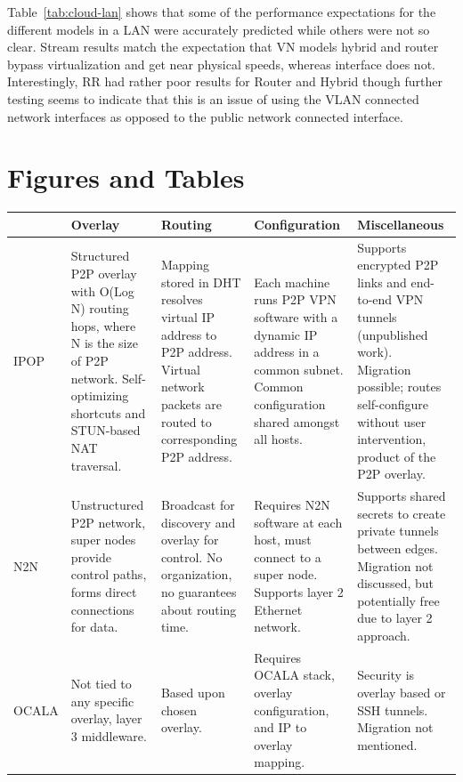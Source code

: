 Table~\ref{tab:cloud-lan} shows that some of the performance expectations
for the different models in a LAN were accurately predicted while others
were not so clear.  Stream results match the expectation that VN models hybrid
and router bypass virtualization and get near physical speeds, whereas interface
does not.  Interestingly, RR had rather poor results for Router and Hybrid
though further testing seems to indicate that this is an issue of using the
VLAN connected network interfaces as opposed to the public network connected
interface.

\section{Figures and Tables}

\begin{table}[ht]
{\small
\centering
\begin{tabular}{|p{.8in}||p{1.25in}|p{1.2in}|p{1.25in}|p{1.25in}|} \hline
& Overlay & Routing & Configuration & Miscellaneous \\ \hline\hline
IPOP
&
Structured P2P overlay with O(Log N) routing hops, where N is the size of P2P
network. Self-optimizing shortcuts and STUN-based NAT traversal.
&
Mapping stored in DHT resolves virtual IP address to P2P address. Virtual
network packets are routed to corresponding P2P address.
&
Each machine runs P2P VPN software with a dynamic IP address in a common subnet.
Common configuration shared amongst all hosts.
&
Supports encrypted P2P links and end-to-end VPN tunnels (unpublished work).
Migration possible; routes self-configure without user intervention, product of
the P2P overlay.
\\ \hline
N2N
&
Unstructured P2P network, super nodes provide control paths, forms direct
connections for data.
&
Broadcast for discovery and overlay for control.  No organization, no guarantees
about routing time.
&
Requires N2N software at each host, must connect to a super node.  Supports
layer 2 Ethernet network.
&
Supports shared secrets to create private tunnels between edges.  Migration not
discussed, but potentially free due to layer 2 approach.
\\ \hline
OCALA
&
Not tied to any specific overlay, layer 3 middleware.
&
Based upon chosen overlay.
&
Requires OCALA stack, overlay configuration, and IP to overlay mapping.
&
Security is overlay based or SSH tunnels.  Migration not mentioned.

\end{tabular}}
\end{table}
